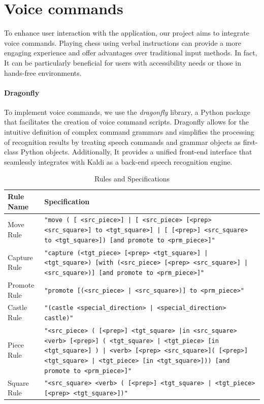 \documentclass[a4paper, 11pt, twocolumn]{IEEEtran}
\begin{document}
    \section{Voice commands}
    To enhance user interaction with the application, our project aims to integrate voice commands. Playing chess using verbal instructions can provide a more engaging experience and offer advantages over traditional input methods. In fact, It can be particularly beneficial for users with accessibility needs or those in hands-free environments.
    \paragraph*{Dragonfly} To implement voice commands, we use the \emph{dragonfly} library, a Python package that facilitates the creation of voice command scripts. Dragonfly allows for the intuitive definition of complex command grammars and simplifies the processing of recognition results by treating speech commands and grammar objects as first-class Python objects. Additionally, It provides a unified front-end interface that seamlessly integrates with Kaldi as a back-end speech recognition engine.
    \begin{table}[h]
        \centering
        \caption{Rules and Specifications}
        \begin{tabularx}{\textwidth}{|l | X|}
            \hline
            \textbf{Rule Name} & \textbf{Specification} \\
            \hline
            Move Rule & \texttt{"move ( [ <src\_piece>] | [ <src\_piece> [<prep> <src\_square>] to <tgt\_square>] | [ [<prep>] <src\_square> to <tgt\_square>]) [and promote to <prm\_piece>]"} \\
            \hline
            Capture Rule & \texttt{"capture (<tgt\_piece> [<prep> <tgt\_square>] | <tgt\_square>) [with (<src\_piece> [<prep> <src\_square>] | <src\_square>)] [and promote to <prm\_piece>]"}\\
            \hline
            Promote Rule & \texttt{"promote [(<src\_piece> | <src\_square>)] to <prm\_piece>"} \\
            \hline 
            Castle Rule & \texttt{"(castle <special\_direction> | <special\_direction> castle)"} \\
            \hline 
            Piece Rule & \texttt{"<src\_piece> ( [<prep>] <tgt\_square> |in <src\_square> <verb> [<prep>] ( <tgt\_square> | <tgt\_piece> [in <tgt\_square>] ) | <verb> [<prep> <src\_square>]( [<prep>] <tgt\_square> | <tgt\_piece>  [in <tgt\_square>])) [and promote to <prm\_piece>]"}\\
            \hline
            Square Rule & \texttt{"<src\_square> <verb> ( [<prep>] <tgt\_square> | <tgt\_piece> [<prep> <tgt\_square>])"}\\
            \hline
        \end{tabularx}
        \label{tab:rules}
    \end{table}
\end{document}
